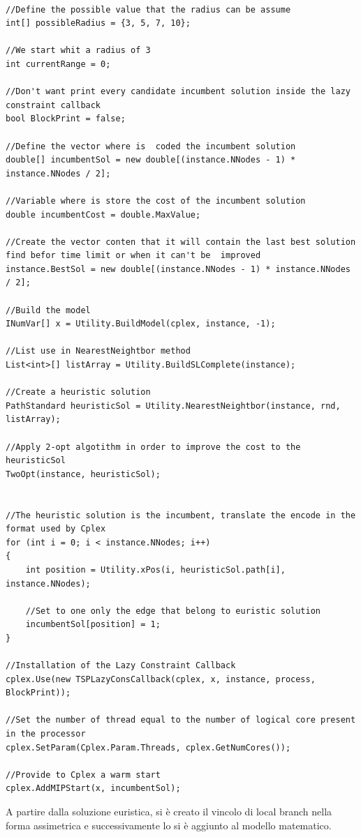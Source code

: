 \documentclass[11pt]{article}
\begin{document}
\begin{lstlisting}

//Define the possible value that the radius can be assume
int[] possibleRadius = {3, 5, 7, 10};

//We start whit a radius of 3
int currentRange = 0;

//Don't want print every candidate incumbent solution inside the lazy constraint callback
bool BlockPrint = false;

//Define the vector where is  coded the incumbent solution
double[] incumbentSol = new double[(instance.NNodes - 1) * instance.NNodes / 2];
            
//Variable where is store the cost of the incumbent solution
double incumbentCost = double.MaxValue;

//Create the vector conten that it will contain the last best solution find befor time limit or when it can't be  improved
instance.BestSol = new double[(instance.NNodes - 1) * instance.NNodes / 2];

//Build the model
INumVar[] x = Utility.BuildModel(cplex, instance, -1);

//List use in NearestNeightbor method
List<int>[] listArray = Utility.BuildSLComplete(instance);

//Create a heuristic solution
PathStandard heuristicSol = Utility.NearestNeightbor(instance, rnd, listArray);

//Apply 2-opt algotithm in order to improve the cost to the heuristicSol
TwoOpt(instance, heuristicSol);


//The heuristic solution is the incumbent, translate the encode in the format used by Cplex
for (int i = 0; i < instance.NNodes; i++)
{
    int position = Utility.xPos(i, heuristicSol.path[i], instance.NNodes);
                
    //Set to one only the edge that belong to euristic solution
    incumbentSol[position] = 1;
}

//Installation of the Lazy Constraint Callback
cplex.Use(new TSPLazyConsCallback(cplex, x, instance, process, BlockPrint));

//Set the number of thread equal to the number of logical core present in the processor
cplex.SetParam(Cplex.Param.Threads, cplex.GetNumCores());

//Provide to Cplex a warm start
cplex.AddMIPStart(x, incumbentSol);

\end{lstlisting}


A partire dalla soluzione euristica, si è creato il vincolo di local branch nella forma assimetrica e successivamente lo si è aggiunto al modello matematico. 
\end{document}

